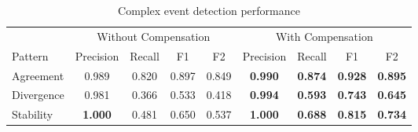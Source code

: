 \begin{table}[htp]
\centering
\caption{Complex event detection performance}
\label{tab:pattern-results}
\begin{tabular}{lcccccccc}
\toprule
 & \multicolumn{4}{c}{Without Compensation} & \multicolumn{4}{c}{With Compensation} \\
\cmidrule(lr){2-5} \cmidrule(lr){6-9}
Pattern & Precision & Recall & F1 & F2 & Precision & Recall & F1 & F2 \\
\midrule

Agreement 
& 0.989 & 0.820 & 0.897 & 0.849
& \textbf{0.990} & \textbf{0.874} & \textbf{0.928} & \textbf{0.895} \\

Divergence 
& 0.981 & 0.366 & 0.533 & 0.418
& \textbf{0.994} & \textbf{0.593} & \textbf{0.743} & \textbf{0.645} \\

Stability 
& \textbf{1.000} & 0.481 & 0.650 & 0.537
& \textbf{1.000} & \textbf{0.688} & \textbf{0.815} & \textbf{0.734} \\

\bottomrule
\end{tabular}
\end{table}